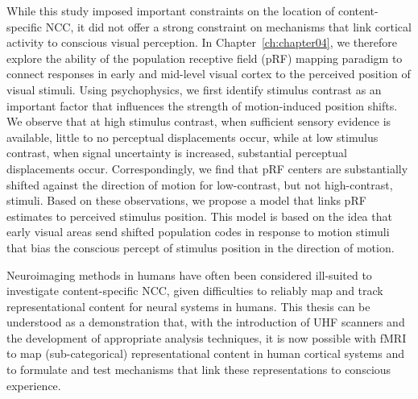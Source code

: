 While this study imposed important constraints on the location of content-specific NCC, it did not offer a strong constraint on mechanisms that link cortical activity to conscious visual perception. In Chapter~\ref{ch:chapter04}, we therefore explore the ability of the population receptive field (pRF) mapping paradigm to connect responses in early and mid-level visual cortex to the perceived position of visual stimuli. Using psychophysics, we first identify stimulus contrast as an important factor that influences the strength of motion-induced position shifts. We observe that at high stimulus contrast, when sufficient sensory evidence is available, little to no perceptual displacements occur, while at low stimulus contrast, when signal uncertainty is increased, substantial perceptual displacements occur. Correspondingly, we find that pRF centers are substantially shifted against the direction of motion for low-contrast, but not high-contrast, stimuli. Based on these observations, we propose a model that links pRF estimates to perceived stimulus position. This model is based on the idea that early visual areas send shifted population codes in response to motion stimuli that bias the conscious percept of stimulus position in the direction of motion.

Neuroimaging methods in humans have often been considered ill-suited to investigate content-specific NCC, given difficulties to reliably map and track representational content for neural systems in humans. This thesis can be understood as a demonstration that, with the introduction of UHF scanners and the development of appropriate analysis techniques, it is now possible with fMRI to map (sub-categorical) representational content in human cortical systems and to formulate and test mechanisms that link these representations to conscious experience.